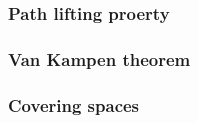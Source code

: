 \documentclass{../../large}
\begin{document}
\section{Path lifting proerty}

\section{Van Kampen theorem}

\section{Covering spaces}

\part{}

\part{}
\end{document}
